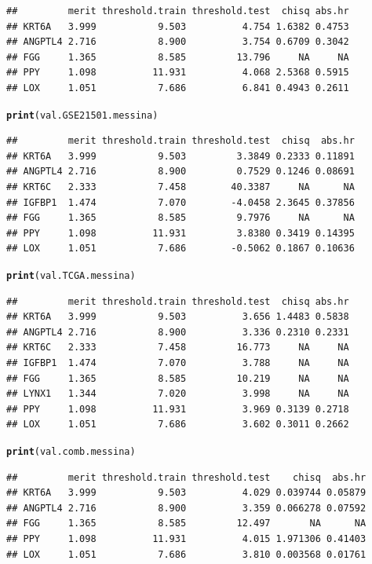 \documentclass{article}\usepackage[]{graphicx}\usepackage[]{color}
\makeatletter
\newcommand{\hlstd}[1]{\textcolor[rgb]{0.345,0.345,0.345}{#1}}%
\newcommand{\hlkwd}[1]{\textcolor[rgb]{0.737,0.353,0.396}{\textbf{#1}}}%
\newenvironment{kframe}{%
 \def\at@end@of@kframe{}%
 \ifinner\ifhmode%
  \def\at@end@of@kframe{\end{minipage}}%
  \begin{minipage}{\columnwidth}%
 \fi\fi%
 \def\FrameCommand##1{\hskip\@totalleftmargin \hskip-\fboxsep
 \colorbox{shadecolor}{##1}\hskip-\fboxsep
     \hskip-\linewidth \hskip-\@totalleftmargin \hskip\columnwidth}%
 \MakeFramed {\advance\hsize-\width
   \@totalleftmargin\z@ \linewidth\hsize
   \@setminipage}}%
 {\par\unskip\endMakeFramed%
 \at@end@of@kframe}
\newenvironment{knitrout}{}{} %
\makeatother
\begin{document}
\begin{knitrout}
\begin{kframe}
\begin{verbatim}
##         merit threshold.train threshold.test  chisq abs.hr
## KRT6A   3.999           9.503          4.754 1.6382 0.4753
## ANGPTL4 2.716           8.900          3.754 0.6709 0.3042
## FGG     1.365           8.585         13.796     NA     NA
## PPY     1.098          11.931          4.068 2.5368 0.5915
## LOX     1.051           7.686          6.841 0.4943 0.2611
\end{verbatim}
\begin{alltt}
\hlkwd{print}\hlstd{(val.GSE21501.messina)}
\end{alltt}
\begin{verbatim}
##         merit threshold.train threshold.test  chisq  abs.hr
## KRT6A   3.999           9.503         3.3849 0.2333 0.11891
## ANGPTL4 2.716           8.900         0.7529 0.1246 0.08691
## KRT6C   2.333           7.458        40.3387     NA      NA
## IGFBP1  1.474           7.070        -4.0458 2.3645 0.37856
## FGG     1.365           8.585         9.7976     NA      NA
## PPY     1.098          11.931         3.8380 0.3419 0.14395
## LOX     1.051           7.686        -0.5062 0.1867 0.10636
\end{verbatim}
\begin{alltt}
\hlkwd{print}\hlstd{(val.TCGA.messina)}
\end{alltt}
\begin{verbatim}
##         merit threshold.train threshold.test  chisq abs.hr
## KRT6A   3.999           9.503          3.656 1.4483 0.5838
## ANGPTL4 2.716           8.900          3.336 0.2310 0.2331
## KRT6C   2.333           7.458         16.773     NA     NA
## IGFBP1  1.474           7.070          3.788     NA     NA
## FGG     1.365           8.585         10.219     NA     NA
## LYNX1   1.344           7.020          3.998     NA     NA
## PPY     1.098          11.931          3.969 0.3139 0.2718
## LOX     1.051           7.686          3.602 0.3011 0.2662
\end{verbatim}
\begin{alltt}
\hlkwd{print}\hlstd{(val.comb.messina)}
\end{alltt}
\begin{verbatim}
##         merit threshold.train threshold.test    chisq  abs.hr
## KRT6A   3.999           9.503          4.029 0.039744 0.05879
## ANGPTL4 2.716           8.900          3.359 0.066278 0.07592
## FGG     1.365           8.585         12.497       NA      NA
## PPY     1.098          11.931          4.015 1.971306 0.41403
## LOX     1.051           7.686          3.810 0.003568 0.01761

\end{verbatim}
\end{kframe}
\end{knitrout}
\end{document}
